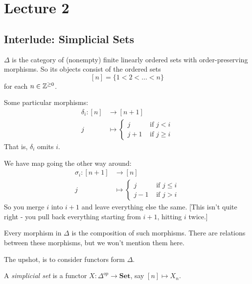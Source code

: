 \documentclass[class=report, crop=false,a4paper,twoside]{standalone}
\begin{document}
\chapter{Lecture 2}
\section{Interlude: Simplicial Sets}
\begin{definition}
	$\Delta$ is the category of (nonempty) finite linearly ordered sets with order-preserving morphisms. So its objects consist of the ordered sets $$[n] = \{1 < 2 < \dots < n\}$$ for each $n \in \mathbb{Z}^{\ge 0}$.
\end{definition}

\begin{example}
	Some particular morphisms:
	\begin{align*}
		\delta_i: [n] &\to [n+1]\\
		j &\mapsto
		\begin{cases}
			j & \text{ if } j < i\\
			j+1 & \text{ if } j \ge i
		\end{cases}
	\end{align*}
	That is, $\delta_i$ omits $i$.

	We have map going the other way around:
	\begin{align*}
		\sigma_i: [n+1] &\to [n]\\
		j &\mapsto
		\begin{cases}
			j &\text{ if } j \le i\\
			j-1 &\text{ if } j > i
		\end{cases}
	\end{align*}
	So you merge $i$ into $i+1$ and leave everything else the same. [This isn't quite right - you pull back everything starting from $i+1$, hitting $i$ twice.]
\end{example}

\begin{remark}\label{simplicial_composition}
Every morphism in $\Delta$ is the composition of such morphisms.
There are relations between these morphisms, but we won't mention them here. 
\end{remark}

The upshot, is to consider functors form $\Delta$.
\begin{definition}
	A \emph{simplicial set} is a functor $X: \Delta^{op} \to \mathbf{Set}$, say $[n] \mapsto X_n$. 
\end{definition}
\end{document}
